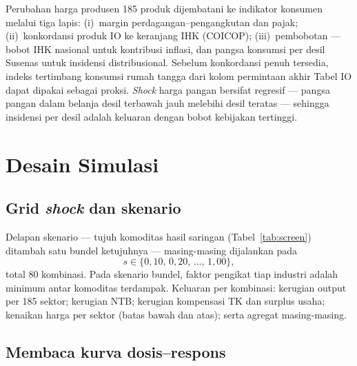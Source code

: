 \documentclass[11pt,a4paper]{article}
\newcommand{\en}[1]{\textit{#1}}   %
\begin{document}
Perubahan harga produsen 185 produk dijembatani ke indikator konsumen
melalui tiga lapis: (i)~margin perdagangan--pengangkutan dan pajak;
(ii)~konkordansi produk IO ke keranjang IHK (COICOP); (iii)~pembobotan ---
bobot IHK nasional untuk kontribusi inflasi, dan pangsa konsumsi per desil
Susenas untuk insidensi distribusional. Sebelum konkordansi penuh
tersedia, indeks tertimbang konsumsi rumah tangga dari kolom permintaan
akhir Tabel IO dapat dipakai sebagai proksi. \en{Shock} harga pangan
bersifat regresif --- pangsa pangan dalam belanja desil terbawah jauh
melebihi desil teratas --- sehingga insidensi per desil adalah keluaran
dengan bobot kebijakan tertinggi.

\section{Desain Simulasi}

\subsection{Grid \en{shock} dan skenario}

Delapan skenario --- tujuh komoditas hasil saringan
(Tabel~\ref{tab:screen}) ditambah satu bundel ketujuhnya --- masing-masing
dijalankan pada
\begin{equation*}
s \in \{0{,}10,\, 0{,}20,\, \ldots,\, 1{,}00\},
\end{equation*}
total 80 kombinasi. Pada skenario bundel, faktor pengikat tiap industri
adalah minimum antar komoditas terdampak. Keluaran per kombinasi: kerugian
output per 185 sektor; kerugian NTB; kerugian kompensasi TK dan surplus
usaha; kenaikan harga per sektor (batas bawah dan atas); serta agregat
masing-masing.

\subsection{Membaca kurva dosis--respons}
\end{document}
